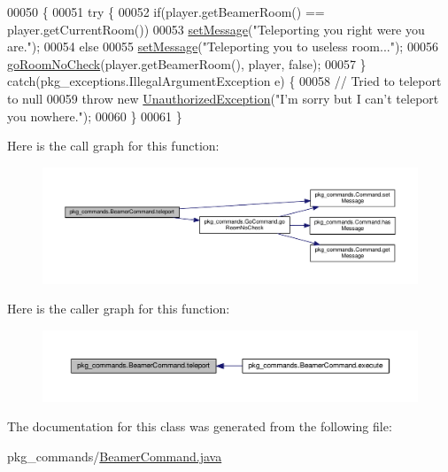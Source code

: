 \begin{DoxyCode}
00050                                                                       \{
00051         \textcolor{keywordflow}{try} \{
00052             \textcolor{keywordflow}{if}(player.getBeamerRoom() == player.getCurrentRoom())
00053                 \hyperlink{classpkg__commands_1_1Command_ae210ff216fe908b111ba1c988a963d13}{setMessage}(\textcolor{stringliteral}{"Teleporting you right were you are."});
00054             \textcolor{keywordflow}{else}
00055                 \hyperlink{classpkg__commands_1_1Command_ae210ff216fe908b111ba1c988a963d13}{setMessage}(\textcolor{stringliteral}{"Teleporting you to useless room..."});
00056             \hyperlink{classpkg__commands_1_1GoCommand_a210afbc5f3ef34d3ad5759d853c8f8c2}{goRoomNoCheck}(player.getBeamerRoom(), player, \textcolor{keyword}{false});
00057         \} \textcolor{keywordflow}{catch}(pkg\_exceptions.IllegalArgumentException e) \{
00058             \textcolor{comment}{// Tried to teleport to null}
00059             \textcolor{keywordflow}{throw} \textcolor{keyword}{new} \hyperlink{classpkg__exceptions_1_1UnauthorizedException}{UnauthorizedException}(\textcolor{stringliteral}{"I'm sorry but I can't teleport you
       nowhere."});
00060         \}
00061     \}
\end{DoxyCode}


Here is the call graph for this function\-:
\nopagebreak
\begin{figure}[H]
\begin{center}
\leavevmode
\includegraphics[width=350pt]{classpkg__commands_1_1BeamerCommand_a2b6c04242d443d4ff36f255b06ce14be_cgraph}
\end{center}
\end{figure}




Here is the caller graph for this function\-:
\nopagebreak
\begin{figure}[H]
\begin{center}
\leavevmode
\includegraphics[width=350pt]{classpkg__commands_1_1BeamerCommand_a2b6c04242d443d4ff36f255b06ce14be_icgraph}
\end{center}
\end{figure}




The documentation for this class was generated from the following file\-:\begin{DoxyCompactItemize}
\item 
pkg\-\_\-commands/\hyperlink{BeamerCommand_8java}{Beamer\-Command.\-java}\end{DoxyCompactItemize}
